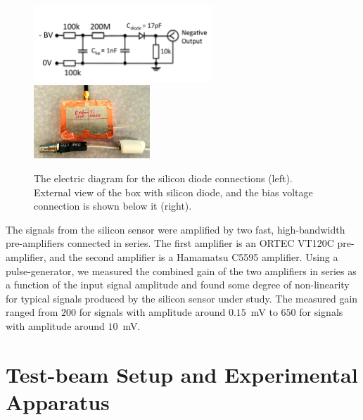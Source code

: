 \documentclass[12pt]{article}
\begin{document}
{\begin{figure}[htbp] 
\centering
\includegraphics[width=0.60\textwidth]{plots/SiliconDiodeDiagram.pdf} 
\includegraphics[width=0.39\textwidth]{plots/SiliconDiodeBox.jpg} 
\caption{The electric diagram for the silicon diode connections (left). External
view of the box with silicon diode, and the bias voltage connection is shown
below it (right).} 
\label{fig:SiliconPad} 
\end{figure} 

The signals from the silicon sensor were amplified by two fast, 
high-bandwidth pre-amplifiers connected in series. The first amplifier is an
ORTEC VT120C pre-amplifier, and the second amplifier is a Hamamatsu C5595
amplifier. Using a pulse-generator, we measured the combined gain
of the two amplifiers in series as a function of the input signal amplitude and
found some degree of non-linearity for typical signals produced by the silicon
sensor under study. The measured gain ranged from $200$ for signals with
amplitude around $0.15$~mV to $650$ for signals with amplitude around $10$~mV.

\section{Test-beam Setup and Experimental Apparatus }
\label{sec:tbeam}

}
\end{document}
